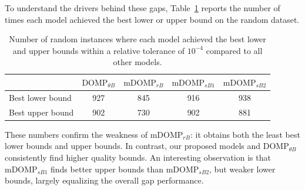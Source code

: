 \documentclass[letterpaper]{article}
\begin{document}
To understand the drivers behind these gaps, Table~\ref{tab:random_best_bounds} reports the number of times each model achieved the best lower or upper bound on the random dataset.
\begin{table}[ht]
    \centering
    \begin{tabular}{lcccc}
        \hline
        & $\text{DOMP}_{\theta B}$ & $\text{mDOMP}_{rB}$ & $\text{mDOMP}_{sB1}$ & $\text{mDOMP}_{sB2}$ \\
        \hline
        Best lower bound & 927 & 845 & 916 & 938 \\
        Best upper bound & 902 & 730 & 902 & 881 \\
        \hline
    \end{tabular}
    \caption{Number of random instances where each model achieved the best lower and upper bounds within a relative tolerance of $10^{-4}$ compared to all other models.}
    \label{tab:random_best_bounds}
\end{table}
These numbers confirm the weakness of $\text{mDOMP}_{rB}$: it obtains both the least best lower bounds and upper bounds. In contrast, our proposed models and $\text{DOMP}_{\theta B}$ consistently find higher quality bounds. An interesting observation is that $\text{mDOMP}_{sB1}$ finds better upper bounds than $\text{mDOMP}_{sB2}$, but weaker lower bounds, largely equalizing the overall gap performance.
\end{document}
